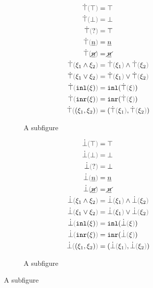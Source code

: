 
\begin{figure}[ht]
\centering
\begin{subfigure}{.4\textwidth}
  \centering
{}

\begin{align*}
  \ctruify{\ctruth} &= \ctruth \\
  \ctruify{\cfalsity} &= \cfalsity \\
  \ctruify{\cunknown} &= \ctruth \\
  \ctruify{\cnum{n}} &= \cnum{n} \\
  \ctruify{\cnotnum{n}} &= \cnotnum{n} \\
  \ctruify{\cand{\xi_1}{\xi_2}} &= \cand{\ctruify{\xi_1}}{\ctruify{\xi_2}} \\
  \ctruify{\cor{\xi_1}{\xi_2}} &= \cor{\ctruify{\xi_1}}{\ctruify{\xi_2}} \\
  \ctruify{\cinl{\xi}} &= \cinl{\ctruify{\xi}} \\
  \ctruify{\cinr{\xi}} &= \cinr{\ctruify{\xi}} \\
  \ctruify{\cpair{\xi_1}{\xi_2}} &= \cpair{\ctruify{\xi_1}}{\ctruify{\xi_2}}
\end{align*}
  \caption{A subfigure}
  \label{fig:sub1}
\end{subfigure}%

\begin{subfigure}{.4\textwidth}
  \centering
\caption{A figure with two subfigures}
\label{fig:test}
\begin{align*}
  \cfalsify{\ctruth} &= \ctruth \\
  \cfalsify{\cfalsity} &= \cfalsity \\
  \cfalsify{\cunknown} &= \cfalsity \\
  \cfalsify{\cnum{n}} &= \cnum{n} \\
  \cfalsify{\cnotnum{n}} &= \cnotnum{n} \\
  \cfalsify{\cand{\xi_1}{\xi_2}} &= \cand{\cfalsify{\xi_1}}{\cfalsify{\xi_2}} \\
  \cfalsify{\cor{\xi_1}{\xi_2}} &= \cor{\cfalsify{\xi_1}}{\cfalsify{\xi_2}} \\
  \cfalsify{\cinl{\xi}} &= \cinl{\cfalsify{\xi}} \\
  \cfalsify{\cinr{\xi}} &= \cinr{\cfalsify{\xi}} \\
  \cfalsify{\cpair{\xi_1}{\xi_2}} &= \cpair{\cfalsify{\xi_1}}{\cfalsify{\xi_2}}
\end{align*}
  \caption{Truify and Falsify Constraints}
  \label{fig:truify-falsify}
  \caption{A subfigure}
  \label{fig:sub2}
\end{subfigure}
\end{figure}